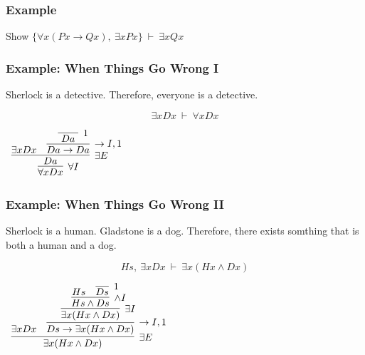 \documentclass{beamer}
\theoremstyle{indentDefn} \newtheorem{defn}[]{Definition}
\begin{document}
\begin{frame}
	\frametitle{Example}
	
	Show $\{\forall x (Px \rightarrow Qx), \ \exists x Px\} \ \vdash \ \exists x Qx$
	
	
	\vspace{6cm}
	
\end{frame}

\begin{frame}
	\frametitle{Example: When Things Go Wrong I}
	
	Sherlock is a detective. Therefore, everyone is a detective. 
	
	\vspace{0.5cm}
	
	$$ \exists x Dx \ \vdash \ \forall x Dx $$
	
	\vspace{0.5cm}
	
	\begin{center}
		$\begin{array}{c}
			\infer[\forall I]{\forall x Dx}{\infer[\exists E]{Da}
					{\exists x Dx & \infer[\rightarrow I, 1]{Da \rightarrow Da}{\infer[1]{ \ Da \ }{}}
				}
			}
		
		 \end{array}$
	\end{center}

	
\end{frame}
	
\begin{frame}
	\frametitle{Example: When Things Go Wrong II}
	
	Sherlock is a human. Gladstone is a dog. Therefore, there exists somthing that is both a human and a dog. 
	
	\vspace{0.5cm}
	
	$$ Hs, \ \exists x Dx \ \vdash \ \exists x (Hx \land Dx) $$
	
	\vspace{0.5cm}
	
	\begin{center}
		$\begin{array}{c}
	
			\infer[\exists E]{\exists x (Hx \land Dx)}{\exists x Dx & \infer[\rightarrow I, 1]{Ds \rightarrow \exists x (Hx \land Dx)}
				{\infer[\exists I]{\exists x (Hx \land Dx)}
					{\infer[\land I]{Hs \land Ds}
						{Hs & \infer[1]{Ds}
							{}}}}}


	     \end{array}$
	\end{center}
\end{frame}
\end{document}
